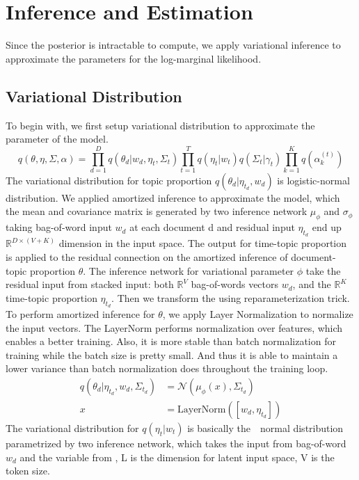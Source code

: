 \section{Inference and Estimation}
Since the posterior is intractable to compute, we apply variational inference to approximate the parameters for the log-marginal likelihood.
\subsection{Variational Distribution}
To begin with, we first setup variational distribution to approximate the parameter of the model. 
\begin{equation}
q(\theta,\eta,\Sigma,\alpha)=\prod_{d=1}^{D}q(\theta_d|w_d,\eta_{t},\Sigma_{t})\prod_{t=1}^{T}q(\eta_t|w_t)q(\Sigma_{t}|\gamma_{t})\prod_{k=1}^{K}q(\alpha_k^{(t)})
\end{equation}
The variational distribution for topic proportion $ q(\theta_d|\eta_{t_d},w_d) $ is logistic-normal distribution. We applied amortized inference to approximate the model, which the mean and covariance matrix is generated by two inference network $ \mu_\phi $ and $ \sigma_\phi $ taking bag-of-word input $ w_d $ at each document d and residual input $ \eta_{t_d} $ end up $ \mathbb{R}^{D\times (V+K)} $ dimension in the input space.
The output for time-topic proportion is applied to the residual connection on the amortized inference of document-topic proportion $ \theta $. The inference network for variational parameter $ \phi $ take the residual input from stacked input: both $ \mathbb{R}^{V} $ bag-of-words vectors $ w_d $, and the $ \mathbb{R}^{K} $ time-topic proportion $ \eta_{t_d} $.
Then we transform the  using reparameterization trick.
To perform amortized inference for $ \theta $, we apply Layer Normalization\cite{ba_layer_2016} to normalize the input vectors. The LayerNorm performs normalization over features, which enables a better training. Also, it is more stable than batch normalization for training while the batch size is pretty small. And thus it is able to maintain a lower variance than batch normalization does throughout the training loop.
\begin{align}\label{eq:ch5_variational_theta}
q(\theta_d|\eta_{t_d},w_d,\Sigma_{t_d})&=\mathcal{N}(\mu_\phi(x),\Sigma_{t_d})\\
x&=\text{LayerNorm}([w_d,\eta_{t_d}])
\end{align}
The variational distribution for $ q(\eta_t|w_t) $ is basically the　normal distribution parametrized by two inference network, which takes the input from bag-of-word $ w_d $ and the variable from \cite{lawrence_learning_2007}, L is the dimension for latent input space, V is the token size.
